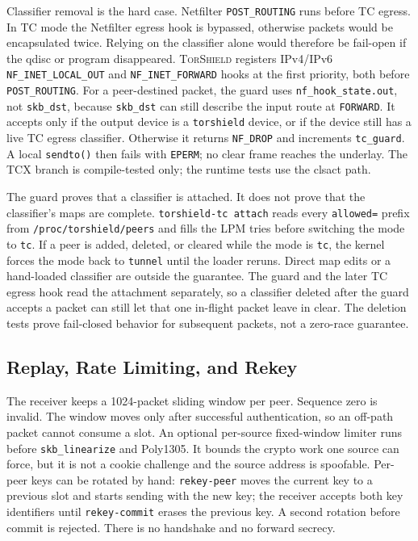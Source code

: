 \documentclass[conference]{IEEEtran}
\newcommand{\sys}{\textsc{TorShield}}
\newcommand{\code}[1]{\texttt{#1}}
\begin{document}
Classifier removal is the hard case. Netfilter \code{POST\_ROUTING} runs before TC egress. In TC mode the Netfilter egress hook is bypassed, otherwise packets would be encapsulated twice. Relying on the classifier alone would therefore be fail-open if the qdisc or program disappeared. \sys{} registers IPv4/IPv6 \code{NF\_INET\_LOCAL\_OUT} and \code{NF\_INET\_FORWARD} hooks at the first priority, both before \code{POST\_ROUTING}. For a peer-destined packet, the guard uses \code{nf\_hook\_state.out}, not \code{skb\_dst}, because \code{skb\_dst} can still describe the input route at \code{FORWARD}. It accepts only if the output device is a \code{torshield} device, or if the device still has a live TC egress classifier. Otherwise it returns \code{NF\_DROP} and increments \code{tc\_guard}. A local \code{sendto()} then fails with \code{EPERM}; no clear frame reaches the underlay. The TCX branch is compile-tested only; the runtime tests use the clsact path.

The guard proves that a classifier is attached. It does not prove that the classifier's maps are complete. \code{torshield-tc attach} reads every \code{allowed=} prefix from \code{/proc/torshield/peers} and fills the LPM tries before switching the mode to \code{tc}. If a peer is added, deleted, or cleared while the mode is \code{tc}, the kernel forces the mode back to \code{tunnel} until the loader reruns. Direct map edits or a hand-loaded classifier are outside the guarantee. The guard and the later TC egress hook read the attachment separately, so a classifier deleted after the guard accepts a packet can still let that one in-flight packet leave in clear. The deletion tests prove fail-closed behavior for subsequent packets, not a zero-race guarantee.

\subsection{Replay, Rate Limiting, and Rekey}
The receiver keeps a 1024-packet sliding window per peer. Sequence zero is invalid. The window moves only after successful authentication, so an off-path packet cannot consume a slot. An optional per-source fixed-window limiter runs before \code{skb\_linearize} and Poly1305. It bounds the crypto work one source can force, but it is not a cookie challenge and the source address is spoofable. Per-peer keys can be rotated by hand: \code{rekey-peer} moves the current key to a previous slot and starts sending with the new key; the receiver accepts both key identifiers until \code{rekey-commit} erases the previous key. A second rotation before commit is rejected. There is no handshake and no forward secrecy.
\end{document}

